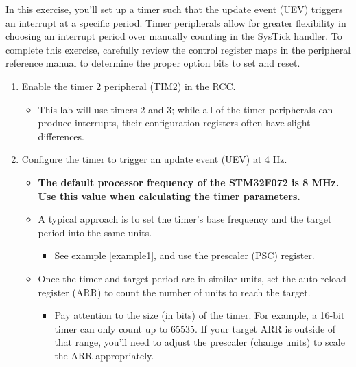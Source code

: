 \documentclass[openany,11pt,fleqn]{book} %
\begin{document}
    \begin{exercise}
        \label{ex1}
        
        In this exercise, you'll set up a timer such that the update event (UEV) triggers an interrupt at a specific period. Timer peripherals allow for greater flexibility in choosing an interrupt period over manually counting in the SysTick handler. To complete this exercise, carefully review the control register maps in the peripheral reference manual to determine the proper option bits to set and reset. 
        
        \begin{enumerate}
            \item Enable the timer 2 peripheral (TIM2) in the RCC.
            \begin{itemize}
                \item This lab will use timers 2 and 3; while all of the timer peripherals can produce interrupts, their configuration registers often have slight differences. 
            \end{itemize}
            \item Configure the timer to trigger an update event (UEV) at 4 Hz.
            \begin{itemize}
                \item \textbf{The default processor frequency of the STM32F072 is 8 MHz. Use this value when calculating the timer parameters.}
                \item A typical approach is to set the timer's base frequency and the target period into the same units. 
                \begin{itemize}
                    \item See example \ref{example1}, and use the prescaler (PSC) register. 
                \end{itemize}
                \item Once the timer and target period are in similar units, set the auto reload register (ARR) to count the number of units to reach the target. 
                \begin{itemize}
                    \item Pay attention to the size (in bits) of the timer. For example, a 16-bit timer can only count up to 65535. If your target ARR is outside of that range, you'll need to adjust the prescaler (change units) to scale the ARR appropriately. 
                \end{itemize}
            \end{itemize}    

\end{enumerate}
\end{exercise}
\end{document}

